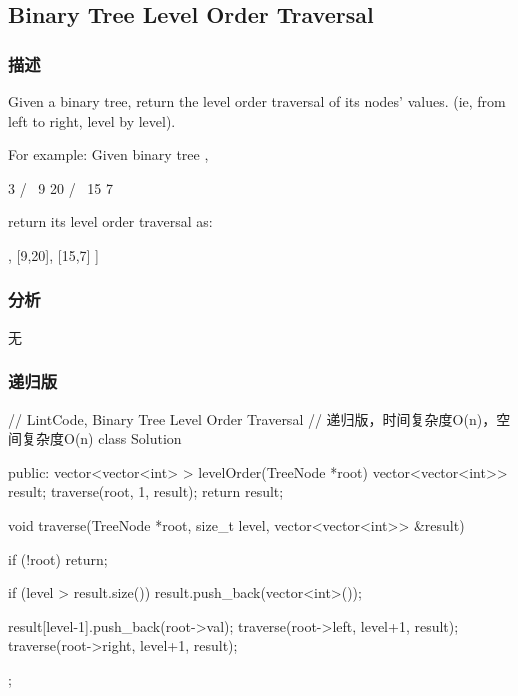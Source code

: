 \subsection{Binary Tree Level Order Traversal}
\label{sec:binary-tree-tevel-order-traversal}


\subsubsection{描述}
Given a binary tree, return the level order traversal of its nodes' values. (ie, from left to right, level by level).

For example:
Given binary tree ,
\begin{Code}
    3
   / \
  9  20
    /  \
   15   7
\end{Code}
return its level order traversal as:
\begin{Code}
[
  [3],
  [9,20],
  [15,7]
]
\end{Code}


\subsubsection{分析}
无


\subsubsection{递归版}
\begin{Code}
// LintCode, Binary Tree Level Order Traversal
// 递归版，时间复杂度O(n)，空间复杂度O(n)
class Solution {
public:
    vector<vector<int> > levelOrder(TreeNode *root) {
        vector<vector<int>> result;
        traverse(root, 1, result);
        return result;
    }

    void traverse(TreeNode *root, size_t level, vector<vector<int>> &result) {
        if (!root) return;

        if (level > result.size())
            result.push_back(vector<int>());

        result[level-1].push_back(root->val);
        traverse(root->left, level+1, result);
        traverse(root->right, level+1, result);
    }
};
\end{Code}


